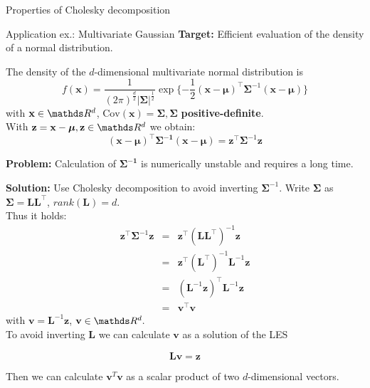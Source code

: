 \documentclass[11pt,compress,t,notes=noshow, xcolor=table]{beamer}
\begin{document}
\begin{vbframe}{Properties of Cholesky decomposition}
\framebreak

\end{vbframe}
\begin{vbframe}{Application ex.: Multivariate Gaussian}
\textbf{Target:} Efficient evaluation of the density of a normal distribution.
\medskip

The density of the $d$-dimensional multivariate normal distribution is
\medskip
$$
f(\mathbf{x})= \frac{1}{(2\pi)^\frac{d}{2}|\boldsymbol{\Sigma}|^\frac{1}{2}} \exp\{-\frac{1}{2}(\mathbf{x}-\boldsymbol{\mu})^\top \boldsymbol{\Sigma}^{-1} (\mathbf{x}-\boldsymbol{\mu})\}
$$
\medskip
with $\mathbf{x}\in\R^{d}$, $\text{Cov}(\mathbf{x}) = \boldsymbol{\Sigma}, \boldsymbol{\Sigma}$ \textbf{positive-definite}.\\
\medskip
With $\mathbf{z} = \mathbf{x}-\boldsymbol{\mu}, \mathbf{z}\in\R^{d} $ we obtain:
$$
(\mathbf{x}-\boldsymbol{\mu})^\top \boldsymbol{\Sigma^{-1}} (\mathbf{x}-\boldsymbol{\mu}) = \mathbf{z}^\top \boldsymbol{\Sigma}^{-1}\mathbf{z}
$$

\lz

\textbf{Problem:} Calculation of $\boldsymbol{\Sigma^{-1}}$ is numerically unstable and requires a long time.
\framebreak

\textbf{Solution:} Use Cholesky decomposition to avoid inverting $\boldsymbol{\Sigma}^{-1}$.
Write $\boldsymbol{\Sigma}$ as  $\boldsymbol{\Sigma} = \mathbf{L}\mathbf{L}^\top$, $rank(\mathbf{L}) = d$.\\
\medskip
Thus it holds:
\begin{eqnarray*}
  \mathbf{z}^\top \boldsymbol{\Sigma}^{-1} \mathbf{z}  &=&  \mathbf{z}^\top (\mathbf{L}\mathbf{L}^\top)^{-1}\mathbf{z} \\
                                                      &=&  \mathbf{z}^\top (\mathbf{L}^\top)^{-1} \mathbf{L}^{-1} \mathbf{z} \\
                                                      &=&  (\mathbf{L}^{-1} \mathbf{z})^\top\mathbf{L}^{-1} \mathbf{z}\\
                                                      &=&  \mathbf{v}^\top\mathbf{v}
\end{eqnarray*}
with $\mathbf{v} = \mathbf{L}^{-1} \mathbf{z}$, $\mathbf{v}\in\R^{d}.$\\
\medskip
To avoid inverting $\mathbf{L}$ we can calculate $\mathbf{v}$ as a solution of the LES

\vspace*{-0.2cm}
$$
\mathbf{L}\mathbf{v} = \mathbf{z}
$$


\medskip
Then we can calculate $\mathbf{v}^{T}\mathbf{v}$ as a scalar product of two $d$-dimensional vectors.
\end{vbframe}



\endlecture
\end{document}
